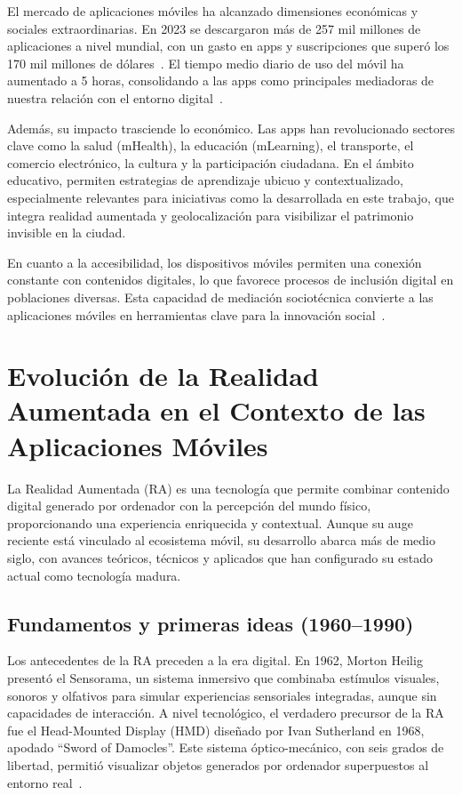 El mercado de aplicaciones móviles ha alcanzado dimensiones económicas y sociales extraordinarias. En 2023 se descargaron más de 257 mil millones de aplicaciones a nivel mundial, con un gasto en apps y suscripciones que superó los 170 mil millones de dólares~\cite{dataai2023}. El tiempo medio diario de uso del móvil ha aumentado a 5 horas, consolidando a las apps como principales mediadoras de nuestra relación con el entorno digital~\cite{appannie2022}.

Además, su impacto trasciende lo económico. Las apps han revolucionado sectores clave como la salud (mHealth), la educación (mLearning), el transporte, el comercio electrónico, la cultura y la participación ciudadana. En el ámbito educativo, permiten estrategias de aprendizaje ubicuo y contextualizado, especialmente relevantes para iniciativas como la desarrollada en este trabajo, que integra realidad aumentada y geolocalización para visibilizar el patrimonio invisible en la ciudad.

En cuanto a la accesibilidad, los dispositivos móviles permiten una conexión constante con contenidos digitales, lo que favorece procesos de inclusión digital en poblaciones diversas. Esta capacidad de mediación sociotécnica convierte a las aplicaciones móviles en herramientas clave para la innovación social~\cite{parsons2020}.



\section{Evolución de la Realidad Aumentada en el Contexto de las Aplicaciones Móviles}

La Realidad Aumentada (RA) es una tecnología que permite combinar contenido digital generado por ordenador con la percepción del mundo físico, proporcionando una experiencia enriquecida y contextual. Aunque su auge reciente está vinculado al ecosistema móvil, su desarrollo abarca más de medio siglo, con avances teóricos, técnicos y aplicados que han configurado su estado actual como tecnología madura.

\subsection{Fundamentos y primeras ideas (1960–1990)}
Los antecedentes de la RA preceden a la era digital. En 1962, Morton Heilig presentó el Sensorama, un sistema inmersivo que combinaba estímulos visuales, sonoros y olfativos para simular experiencias sensoriales integradas, aunque sin capacidades de interacción. A nivel tecnológico, el verdadero precursor de la RA fue el Head-Mounted Display (HMD) diseñado por Ivan Sutherland en 1968, apodado “Sword of Damocles”. Este sistema óptico-mecánico, con seis grados de libertad, permitió visualizar objetos generados por ordenador superpuestos al entorno real~\cite{azuma1997}.

